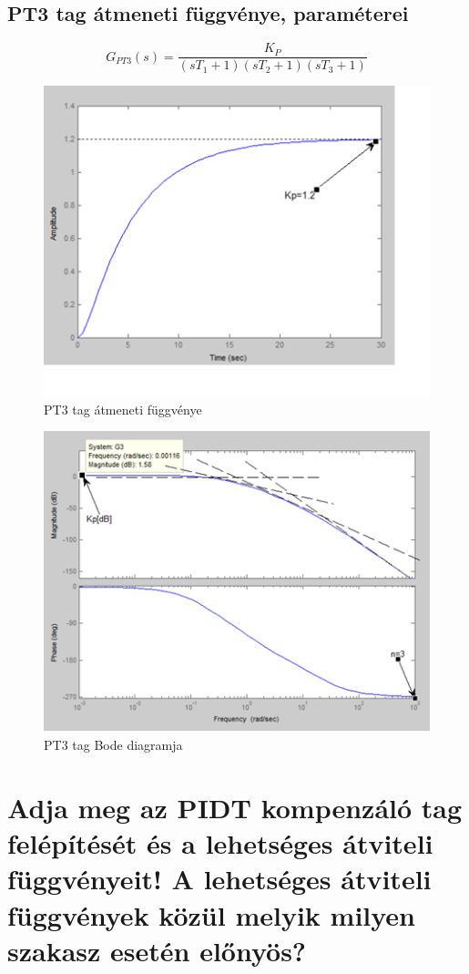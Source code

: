 \documentclass[11pt,a4paper]{article}
\begin{document}
\subsection{PT3 tag átmeneti függvénye, paraméterei}
$$G_{PT3}\left(s\right)=\frac{K_P}{\left(sT_1+1\right)\left(sT_2+1\right)\left(sT_3+1\right)}$$
\begin{figure}[hbtp]
    	 \centering
		\includegraphics[scale=0.8]{43_pt3_atmeneti.png}
		\caption{PT3 tag átmeneti függvénye}
\end{figure}
\begin{figure}[hbtp]
    	 \centering
		\includegraphics[scale=0.8]{44_pt3_bode.png}
		\caption{PT3 tag Bode diagramja}
\end{figure}
\section{Adja meg az PIDT kompenzáló tag felépítését és a lehetséges átviteli függvényeit! A lehetséges átviteli függvények közül melyik milyen szakasz esetén előnyös?}
\end{document}
